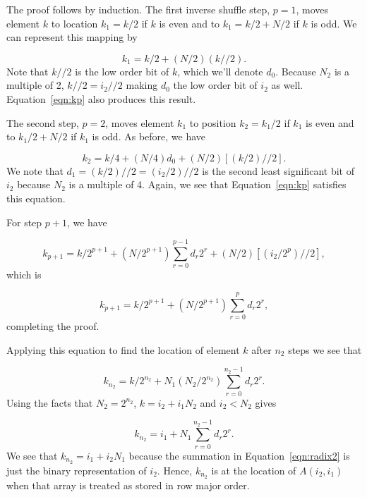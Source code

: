 \documentclass{article}
\begin{document}
The proof follows by induction.  The first inverse shuffle step, $p =
1$, moves element $k$ to location $k_1 = k/2$ if $k$ is even and to
$k_1 = k/2 + N/2$ if $k$ is odd.  We can represent this mapping
by

\begin{equation}
  k_1 = k/2 + (N/2)(k//2).
\end{equation}
%
Note that $k//2$ is the low order bit of $k$, which we'll denote
$d_0$.  Because $N_2$ is a multiple of 2, $k//2 = i_2//2$ making $d_0$
the low order bit of $i_2$ as well.  Equation~\ref{eqn:kp} also
produces this result.

The second step, $p = 2$, moves element $k_1$ to position $k_2 =
k_1/2$ if $k_1$ is even and to $k_1/2 + N/2$ if $k_1$ is odd.  As
before, we have

\begin{equation}
  k_2 = k/4 + (N/4) d_0 + (N/2)[(k/2)//2].
\end{equation}
%
We note that $d_1 = (k/2)//2 = (i_2/2)//2$ is the second least
significant bit of $i_2$ because $N_2$ is a multiple of 4.  Again, we
see that Equation~\ref{eqn:kp} satisfies this equation.

For step $p+1$, we have

\begin{equation}
  k_{p+1} = k/2^{p+1} +
            (N/2^{p+1})\sum_{r=0}^{p-1} d_r 2^r + 
            (N/2)[(i_2/2^p)//2],
\end{equation}
%
which is

\begin{equation}
  k_{p+1} = k/2^{p+1} + (N/2^{p+1})\sum_{r=0}^{p} d_r 2^r,
\end{equation}
%
completing the proof.

Applying this equation to find the location of element $k$ after $n_2$
steps we see that

\begin{equation}
  k_{n_2} = k/2^{n_2} + N_1(N_2/2^{n_2}) \sum_{r=0}^{n_2-1} d_r 2^r.
\end{equation}
%
Using the facts that $N_2 = 2^{n_2}$, $k = i_2 + i_1N_2$ and $i_2 <
N_2$ gives

\begin{equation} \label{eqn:radix2}
  k_{n_2} = i_1 + N_1 \sum_{r=0}^{n_2-1} d_r 2^r.
\end{equation}
%
We see that $k_{n_2} = i_1+i_2N_1$ because the summation in
Equation~\ref{eqn:radix2} is just the binary representation of $i_2$.
Hence, $k_{n_2}$ is at the location of $A(i_2,i_1)$ when that array is
treated as stored in row major order.
\end{document}
